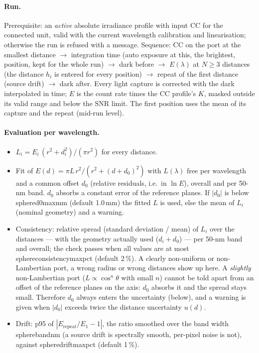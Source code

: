 \documentclass[12pt,a4paper]{article}
\DeclareRobustCommand{\key}[1]{{\ttfamily\small\color{acc2}\def\_{\rawus\allowbreak}#1}}
\begin{document}
\paragraph{Run.}
Prerequisite: an \emph{active} absolute irradiance profile with input CC for the
connected unit, valid with the current wavelength calibration and
linearisation; otherwise the run is refused with a message. Sequence:
CC on the port at the smallest distance $\to$ integration time (auto exposure
at this, the brightest, position, kept for the whole run) $\to$ dark before
$\to$ $E(\lambda)$ at $N\ge 3$ distances (the distance $h_i$ is entered for
every position) $\to$ repeat of the first distance (source drift) $\to$ dark
after. Every light capture is corrected with the dark interpolated in time;
$E$ is the count rate times the CC profile's $K$, masked outside its valid range
and below the SNR limit. The first position uses the mean of its capture and
the repeat (mid-run level).

\paragraph{Evaluation per wavelength.}
\begin{itemize}
  \item $L_i = E_i\,(r^2+d_i^2)/(\pi r^2)$ for every distance.
  \item Fit of $E(d) = \pi L\,r^2/(r^2+(d+d_0)^2)$ with $L(\lambda)$ free per
        wavelength and a common offset $d_0$ (relative residuals, i.e.\ in
        $\ln E$), overall and per 50-nm band. $d_0$ absorbs a constant error of
        the reference planes. If $|d_0|$ is below \key{sphere\_d0\_max\_mm}
        (default 1.0\,mm) the fitted $L$ is used, else the mean of $L_i$
        (nominal geometry) and a warning.
  \item Consistency: relative spread (standard deviation / mean) of $L_i$ over
        the distances --- with the geometry actually used ($d_i+d_0$) --- per
        50-nm band and overall; the check passes when all values are at most
        \key{sphere\_consistency\_max\_pct} (default 2\,\%). A clearly
        non-uniform or non-Lambertian port, a wrong radius or wrong distances
        show up here. A \emph{slightly} non-Lambertian port
        ($L\propto\cos^n\theta$ with small $n$) cannot be told apart from an
        offset of the reference planes on the axis: $d_0$ absorbs it and the
        spread stays small. Therefore $d_0$ always enters the uncertainty
        (below), and a warning is given when $|d_0|$ exceeds twice the
        distance uncertainty $u(d)$.
  \item Drift: p95 of $|E_{\mathrm{repeat}}/E_1-1|$, the ratio smoothed over
        the band width \key{sphere\_band\_nm} (a source drift is spectrally
        smooth, per-pixel noise is not), against
        \key{sphere\_drift\_max\_pct} (default 1\,\%).
\end{itemize}
\end{document}
